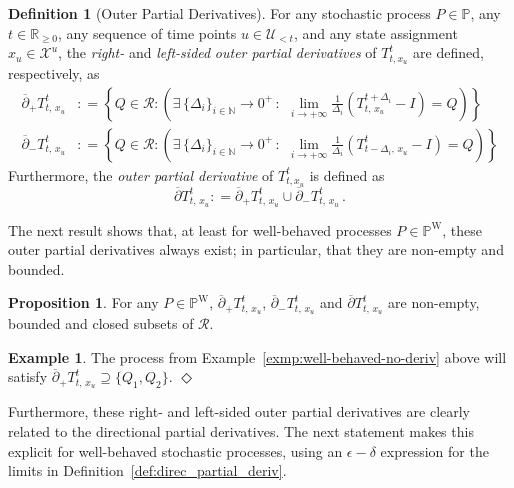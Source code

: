 \documentclass[10pt,a4paper]{paper}
\theoremstyle{definition}
\newtheorem{exmp}{Example}%
\newtheorem{proposition}[theorem]{Proposition}
\newtheorem{definition}{Definition}
\newcommand{\nats}{\mathbb{N}}
\newcommand{\reals}{\mathbb{R}}
\newcommand{\realsnonneg}{\reals_{\geq 0}}
\newcommand{\states}{\mathcal{X}}
\newcommand{\processes}{\mathbb{P}}
\newcommand{\wprocesses}{\processes^{\mathrm{W}}}
\newcommand{\coloneqq}{:\!=}
\newcommand{\exampleend}{\hfill$\Diamond$}
\begin{document}
\begin{definition}[Outer Partial Derivatives]
For any stochastic process $P\in\processes$, any $t\in\realsnonneg$, any sequence of time points $u\in\mathcal{U}_{<t}$, and any state assignment $x_u\in\states^u$, the \emph{right-} and \emph{left-sided} \emph{outer partial derivatives} of $T_{t,x_u}^t$ are defined, respectively, as
\begin{align}
\overline{\partial}_{+}
{T^t_{t,\,x_u}}
&\coloneqq
\left\{
Q\in\mathcal{R}
\colon
\left(\exists \,\{\Delta_i\}_{i\in\nats}\to0^+\,:\,
~
\lim_{i\to+\infty}
\frac{1}{\Delta_i}
(T^{t+\Delta_i}_{t,\,x_u}-I)
=Q
\right)
\right\}\label{eq:rightouterderivative}\\
\overline{\partial}_{-}
{T^t_{t,\,x_u}}
&\coloneqq
\left\{
Q\in\mathcal{R}
\colon
\left(\exists\, \{\Delta_i\}_{i\in\nats}\to0^+\,:\,
~
\lim_{i\to+\infty}
\frac{1}{\Delta_i}
(T^{t}_{t-\Delta_i,\,x_u}-I)
=Q
\right)\label{eq:leftouterderivative}
\right\}
\end{align}
Furthermore, the \emph{outer partial derivative} of $T_{t,x_u}^t$ is defined as
\begin{equation*}
\overline{\partial}
{T^t_{t,\,x_u}}
\coloneqq
\overline{\partial}_{+}
{T^t_{t,\,x_u}}
\cup
\overline{\partial}_{-}
{T^t_{t,\,x_u}}\,.
\end{equation*}
\end{definition}

The next result shows that, at least for well-behaved processes $P\in\wprocesses$, these outer partial derivatives always exist; in particular, that they are non-empty and bounded.

\begin{proposition}\label{prop:boundednon-emptyandclosed}
For any $P\in\wprocesses$, $\overline{\partial}_{+}
{T^t_{t,\,x_u}}$, $\overline{\partial}_{-}
{T^t_{t,\,x_u}}$ and $\overline{\partial}
{T^t_{t,\,x_u}}$ are non-empty, bounded and closed subsets of $\mathcal{R}$.
\end{proposition}

\begin{exmp}
The process from Example~\ref{exmp:well-behaved-no-deriv} above will satisfy $\overline{\partial}_{+}
{T^t_{t,\,x_u}}\supseteq \{Q_1,Q_2\}$.
\exampleend
\end{exmp}

\noindent Furthermore, these right- and left-sided outer partial derivatives are clearly related to the directional partial derivatives. The next statement makes this explicit for well-behaved stochastic processes, using an $\epsilon-\delta$ expression for the limits in Definition~\ref{def:direc_partial_deriv}.
\end{document}
